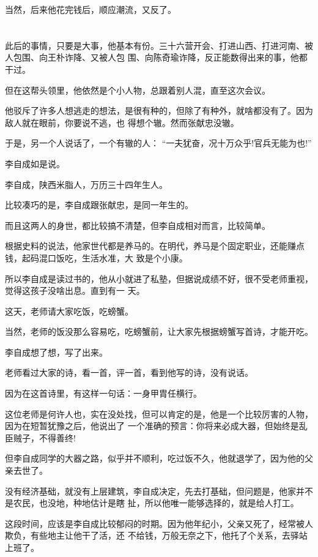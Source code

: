 \documentclass[11pt,a4paper,onecolumn]{article}
\begin{document}
当然，后来他花完钱后，顺应潮流，又反了。

\section[\thesection]{}

此后的事情，只要是大事，他基本有份。三十六营开会、打进山西、打进河南、被人包围、向王朴诈降、又被人包
围、向陈奇瑜诈降，反正能数得出来的事，他都干过。

但在这帮头领里，他依然是个小人物，总跟着别人混，直至这次会议。

他驳斥了许多人想逃走的想法，是很有种的，但除了有种外，就啥都没有了。因为敌人就在眼前，你要说不逃，也
得想个辙。然而张献忠没辙。

于是，另一个人说话了，一个有辙的人： ``一夫犹奋，况十万众乎!官兵无能为也!''

李自成如是说。

李自成，陕西米脂人，万历三十四年生人。

比较凑巧的是，李自成跟张献忠，是同一年生的。

而且这两人的身世，都比较搞不清楚，但李自成相对而言，比较简单。

根据史料的说法，他家世代都是养马的。在明代，养马是个固定职业，还能赚点钱，起码混口饭吃，生活水准，大
致是个小康。

所以李自成是读过书的，他从小就进了私塾，但据说成绩不好，很不受老师重视，觉得这孩子没啥出息。直到有一
天。

这天，老师请大家吃饭，吃螃蟹。

当然，老师的饭没那么容易吃，吃螃蟹前，让大家先根据螃蟹写首诗，才能开吃。

李自成想了想，写了出来。

老师看过大家的诗，看一首，评一首，看到他写的诗，没有说话。

因为在这首诗里，有这样一句话：一身甲胄任横行。

这位老师是何许人也，实在没处找，但可以肯定的是，他是一个比较厉害的人物，因为在短暂犹豫之后，他说出了
一个准确的预言：你将来必成大器，但始终是乱臣贼子，不得善终!

但李自成同学的大器之路，似乎并不顺利，吃过饭不久，他就退学了，因为他的父亲去世了。

没有经济基础，就没有上层建筑，李自成决定，先去打基础，但问题是，他家并不是农民，也没地，种地估计是瞎
扯，所以他唯一能够选择的，就是给人打工。

这段时间，应该是李自成比较郁闷的时期。因为他年纪小，父亲又死了，经常被人欺负，有些地主让他干了活，还
不给钱，万般无奈之下，他托了个关系，去驿站上班了。
\end{document}
